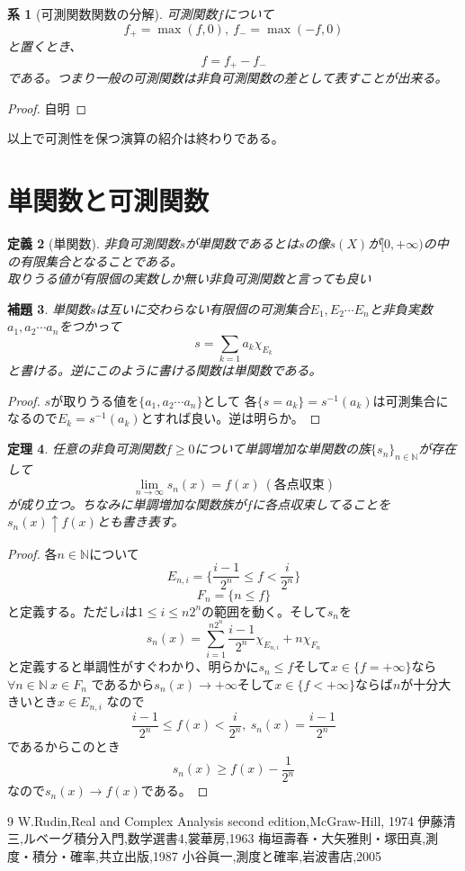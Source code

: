 \documentclass[leqno]{jsarticle}
\newtheorem{thm}{定理}
\newtheorem{cor}[thm]{系}
\newtheorem{lem}[thm]{補題}
\newtheorem{df}[thm]{定義}
\newcommand{\nn}{\mathbb{N}}
\newcommand{\mgn}{\infty}
\begin{document}
\begin{cor}[可測関数関数の分解]可測関数$f$について
\[
f_{+}=\max(f,0),\ f_{-}=\max(-f,0)
\]
と置くとき、
\[
f=f_{+}-f_{-}
\]
である。つまり一般の可測関数は非負可測関数の差として表すことが出来る。
\end{cor}
\begin{proof}
自明
\end{proof}

以上で可測性を保つ演算の紹介は終わりである。
\section{単関数と可測関数}

\begin{df}[単関数]非負可測関数$s$が単関数であるとは$s$の像$s(X)$が$[0,+\mgn)$の中の有限集合となることである。\\ 
取りうる値が有限個の実数しか無い非負可測関数と言っても良い
\end{df}



\begin{lem}
単関数$s$は互いに交わらない有限個の可測集合$E_1,E_2\cdots E_n$と非負実数$a_1,a_2\cdots a_n$をつかって
\[
s=\sum_{k=1}a_k\chi_{E_k}
\]
と書ける。逆にこのように書ける関数は単関数である。
\end{lem}
\begin{proof}$s$が取りうる値を$\{a_1,a_2\cdots a_n\}$として
各$\{s=a_k\}=s^{-1}(a_k)$は可測集合になるので$E_k=s^{-1}(a_k)$とすれば良い。逆は明らか。
\end{proof}


\begin{thm}
任意の非負可測関数$f\ge0$について単調増加な単関数の族$\{s_n\}_{n\in\nn}$が存在して
\[
\lim_{n\to\mgn}s_n(x)=f(x)\ (各点収束)
\]
が成り立つ。ちなみに単調増加な関数族が$f$に各点収束してることを$s_n(x)\uparrow f(x)$とも書き表す。
\end{thm}
\begin{proof}各$n\in \nn$について
\[
E_{n,i}=\{\frac{i-1}{2^n}\le f<\frac{i}{2^n}\}
\]
\[
F_n=\{n\le f\}
\]
と定義する。ただし$i$は$1\le i\le n2^n$の範囲を動く。そして$s_n$を
\[
s_n(x)=\sum_{i=1}^{n2^n}\frac{i-1}{2^n}\chi_{E_{n,i}}+n\chi_{F_n}
\]と定義すると単調性がすぐわかり、明らかに$s_n\le f$そして$x\in \{f=+\mgn\}$なら$\forall n\in \nn\ x\in F_n$
であるから$s_n(x)\to +\mgn$そして$x\in \{f<+\mgn\}$ならば$n$が十分大きいとき$x\in E_{n,i}$
なので
\[
\frac{i-1}{2^n}\le f(x)<\frac{i}{2^n},\ s_n(x)=\frac{i-1}{2^n}
\]
であるからこのとき
\[
s_n(x)\ge f(x)-\frac{1}{2^n}
\]
なので$s_n(x)\to f(x)$である。
\end{proof}
























	
\begin{thebibliography}{9}
W.Rudin,Real and Complex Analysis second edition,McGraw-Hill, 1974
伊藤清三,ルベーグ積分入門,数学選書4,裳華房,1963
梅垣壽春・大矢雅則・塚田真,測度・積分・確率,共立出版,1987
小谷眞一,測度と確率,岩波書店,2005
\end{thebibliography}




			
\end{document}
